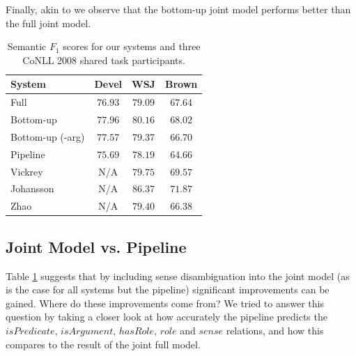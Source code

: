 Finally, akin to \citet{riedel08collective} we observe that the bottom-up joint model performs better than the full joint model. %



\begin{table}[ht]
    \centering
    \begin{tabular}{|p{3.0cm}|c|c|c|}\hline
        System                    & Devel      & WSJ       & Brown \\\hline 
        Full                      & $76.93$  & $79.09$ & $67.64$ \\
        Bottom-up                 & $77.96$  & $80.16$ & $68.02$ \\
        Bottom-up (-arg)          & $77.57$  & $79.37$ & $66.70$ \\
        Pipeline                  & $75.69$  & $78.19$ & $64.66$ \\
        \hline
        Vickrey                   &   N/A    & $79.75$ & $69.57$ \\
        Johansson                 &   N/A    & $86.37$ & $71.87$ \\
        Zhao                      &   N/A    & $79.40$ & $66.38$ \\
        \hline
    \end{tabular}
    \caption{Semantic $F_1$ scores for our systems and three CoNLL 2008 shared task participants.} 
    \label{tbl:results}
\end{table}







\subsection{Joint Model vs. Pipeline}
Table \ref{tbl:results} suggests that by including sense disambiguation into the joint model (as is the case for all systems but the pipeline) significant improvements can be gained. Where do these improvements come from? We tried to answer this question by taking a closer look at how accurately the pipeline predicts the $isPredicate$, $isArgument$, $hasRole$, $role$ and $sense$ relations, and how this compares to the result of the joint full model.

